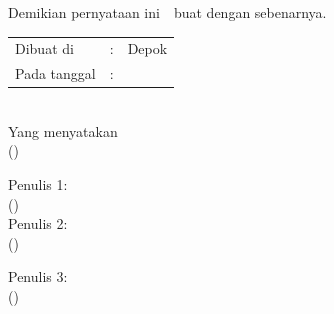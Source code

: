 \noindent Demikian pernyataan ini~\ifx\blank{}\fi~buat dengan sebenarnya.

\ifx\blank\npmDua\else\clearpage\fi



\begin{center}
	\vspace*{0.8cm}
	\begin{tabular}{lll}
		Dibuat di&: & Depok \\
		Pada tanggal&: & \tanggalSiapSidang \\
	\end{tabular}\\

	\vspace*{0.2cm}
	Yang menyatakan \\
	\ifx\blank\npmDua
		\vspace*{2cm}
		(\penulisSatu)
	\else
		\begin{multicols}{2}
			Penulis 1:\\
			\vspace*{2cm}
			(\penulisSatu)\\

			Penulis 2:\\
			\vspace*{2cm}
			(\penulisDua)\\
		\end{multicols}
	\fi
	\ifx\blank\npmTiga\else
		\vspace*{0.2cm}
		Penulis 3:\\
		\vspace*{2cm}
		(\penulisTiga)
	\fi
\end{center}

\newpage
